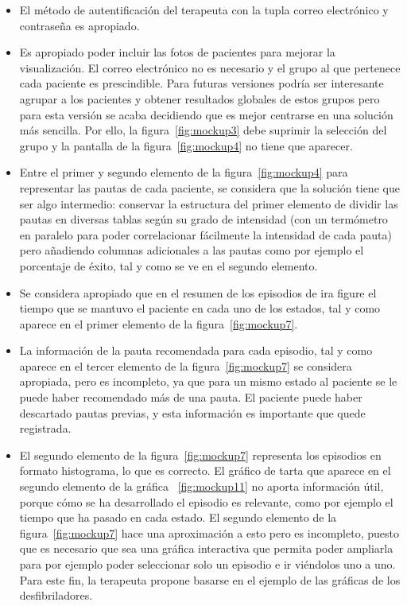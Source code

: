 \begin{itemize}
    \item El método de autentificación del terapeuta con la tupla correo electrónico y contraseña es apropiado.
    \item Es apropiado poder incluir las fotos de pacientes para mejorar la visualización. El correo electrónico no es necesario y el grupo al que pertenece cada paciente es prescindible. Para futuras versiones podría ser interesante agrupar a los pacientes y obtener resultados globales de estos grupos pero para esta versión se acaba decidiendo que es mejor centrarse en una solución más sencilla. Por ello, la figura~\ref{fig:mockup3} debe suprimir la selección del grupo y la pantalla de la figura~\ref{fig:mockup4} no tiene que aparecer.
    \item Entre el primer y segundo elemento de la figura~\ref{fig:mockup4} para representar las pautas de cada paciente, se considera que la solución tiene que ser algo intermedio: conservar la estructura del primer elemento de dividir las pautas en diversas tablas según su grado de intensidad (con un termómetro en paralelo para poder correlacionar fácilmente la intensidad de cada pauta) pero añadiendo columnas adicionales a las pautas como por ejemplo el porcentaje de éxito, tal y como se ve en el segundo elemento.
    \item Se considera apropiado que en el resumen de los episodios de ira figure el tiempo que se mantuvo el paciente en cada uno de los estados, tal y como aparece en el primer elemento de la figura~\ref{fig:mockup7}.
    \item La información de la pauta recomendada para cada episodio, tal y como aparece en el tercer elemento de la figura~\ref{fig:mockup7} se considera apropiada, pero es incompleto, ya que para un mismo estado al paciente se le puede haber recomendado más de una pauta. El paciente puede haber descartado pautas previas, y esta información es importante que quede registrada.
    \item El segundo elemento de la figura~\ref{fig:mockup7} representa los episodios en formato histograma, lo que es correcto. El gráfico de tarta que aparece en el segundo elemento de la gráfica ~\ref{fig:mockup11} no aporta información útil, porque cómo se ha desarrollado el episodio es relevante, como por ejemplo el tiempo que ha pasado en cada estado. El segundo elemento de la figura~\ref{fig:mockup7} hace una aproximación a esto pero es incompleto, puesto que es necesario que sea una gráfica interactiva que permita poder ampliarla para por ejemplo poder seleccionar solo un episodio e ir viéndolos uno a uno. Para este fin, la terapeuta propone basarse en el ejemplo de las gráficas de los desfibriladores.

\end{itemize}
